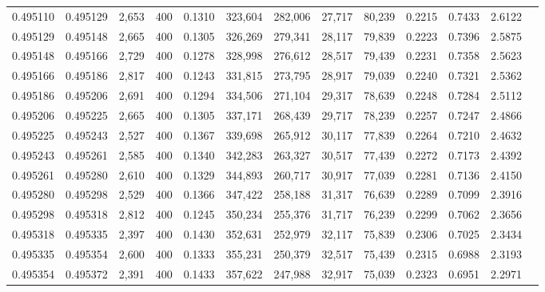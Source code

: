 \begin{tabular}{rrrrrrrrrrrrr}
0.495110 & 0.495129 &  2,653 & 400 &                                     0.1310 & 323,604 & 282,006 &  27,717 &  80,239 & 0.2215 & 0.7433 & 2.6122 \\
0.495129 & 0.495148 &  2,665 & 400 &                                     0.1305 & 326,269 & 279,341 &  28,117 &  79,839 & 0.2223 & 0.7396 & 2.5875 \\
0.495148 & 0.495166 &  2,729 & 400 &                                     0.1278 & 328,998 & 276,612 &  28,517 &  79,439 & 0.2231 & 0.7358 & 2.5623 \\
0.495166 & 0.495186 &  2,817 & 400 &                                     0.1243 & 331,815 & 273,795 &  28,917 &  79,039 & 0.2240 & 0.7321 & 2.5362 \\
0.495186 & 0.495206 &  2,691 & 400 &                                     0.1294 & 334,506 & 271,104 &  29,317 &  78,639 & 0.2248 & 0.7284 & 2.5112 \\
0.495206 & 0.495225 &  2,665 & 400 &                                     0.1305 & 337,171 & 268,439 &  29,717 &  78,239 & 0.2257 & 0.7247 & 2.4866 \\
0.495225 & 0.495243 &  2,527 & 400 &                                     0.1367 & 339,698 & 265,912 &  30,117 &  77,839 & 0.2264 & 0.7210 & 2.4632 \\
0.495243 & 0.495261 &  2,585 & 400 &                                     0.1340 & 342,283 & 263,327 &  30,517 &  77,439 & 0.2272 & 0.7173 & 2.4392 \\
0.495261 & 0.495280 &  2,610 & 400 &                                     0.1329 & 344,893 & 260,717 &  30,917 &  77,039 & 0.2281 & 0.7136 & 2.4150 \\
0.495280 & 0.495298 &  2,529 & 400 &                                     0.1366 & 347,422 & 258,188 &  31,317 &  76,639 & 0.2289 & 0.7099 & 2.3916 \\
0.495298 & 0.495318 &  2,812 & 400 &                                     0.1245 & 350,234 & 255,376 &  31,717 &  76,239 & 0.2299 & 0.7062 & 2.3656 \\
0.495318 & 0.495335 &  2,397 & 400 &                                     0.1430 & 352,631 & 252,979 &  32,117 &  75,839 & 0.2306 & 0.7025 & 2.3434 \\
0.495335 & 0.495354 &  2,600 & 400 &                                     0.1333 & 355,231 & 250,379 &  32,517 &  75,439 & 0.2315 & 0.6988 & 2.3193 \\
0.495354 & 0.495372 &  2,391 & 400 &                                     0.1433 & 357,622 & 247,988 &  32,917 &  75,039 & 0.2323 & 0.6951 & 2.2971 \\

\end{tabular}
